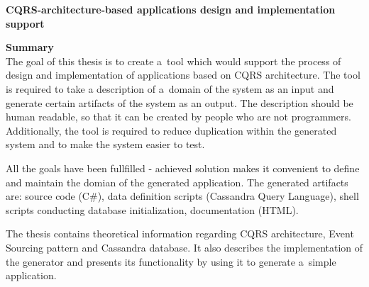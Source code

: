 
\begin{center}
 \large \textbf{CQRS-architecture-based applications design and implementation support}
\end{center}

\vspace*{1cm}

\textbf{Summary} \\

The goal of this thesis is to create a~tool which would support the process of design and implementation of applications based on CQRS architecture.
The tool is required to take a description of a~domain of the system as an input and generate certain artifacts of the system as an output.
The description should be human readable, so that it can be created by people who are not programmers.
Additionally, the tool is required to reduce duplication within the generated system and to make the system easier to test.

All the goals have been fullfilled - achieved solution makes it convenient to define and maintain the domian of the generated application.
The generated artifacts are: source code (C\#), data definition scripts (Cassandra Query Language), shell scripts conducting database initialization, documentation (HTML).

The thesis contains theoretical information regarding CQRS architecture, Event Sourcing pattern and Cassandra database.
It also describes the implementation of the generator and presents its functionality by using it to generate a~simple application.


